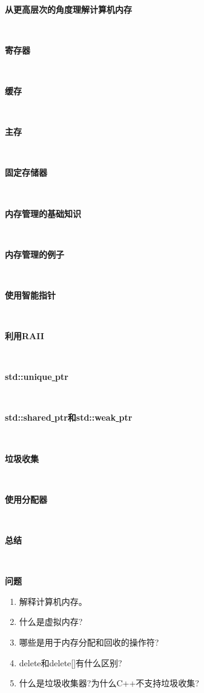 \noindent\textbf{}\ \par
\textbf{从更高层次的角度理解计算机内存} \ \par


\noindent\textbf{}\ \par
\textbf{寄存器} \ \par


\noindent\textbf{}\ \par
\textbf{缓存} \ \par


\noindent\textbf{}\ \par
\textbf{主存} \ \par


\noindent\textbf{}\ \par
\textbf{固定存储器} \ \par


\noindent\textbf{}\ \par
\textbf{内存管理的基础知识} \ \par


\noindent\textbf{}\ \par
\textbf{内存管理的例子} \ \par


\noindent\textbf{}\ \par
\textbf{使用智能指针} \ \par


\noindent\textbf{}\ \par
\textbf{利用RAII} \ \par


\noindent\textbf{}\ \par
\textbf{std::unique\underline{ }ptr} \ \par


\noindent\textbf{}\ \par
\textbf{std::shared\underline{ }ptr和std::weak\underline{ }ptr} \ \par


\noindent\textbf{}\ \par
\textbf{垃圾收集} \ \par


\noindent\textbf{}\ \par
\textbf{使用分配器} \ \par


\noindent\textbf{}\ \par
\textbf{总结} \ \par


\noindent\textbf{}\ \par
\textbf{问题} \ \par
\begin{enumerate}
	\item 解释计算机内存。
	\item 什么是虚拟内存?
	\item 哪些是用于内存分配和回收的操作符?
	\item delete和delete[]有什么区别?
	\item 什么是垃圾收集器?为什么C++不支持垃圾收集?
\end{enumerate}

